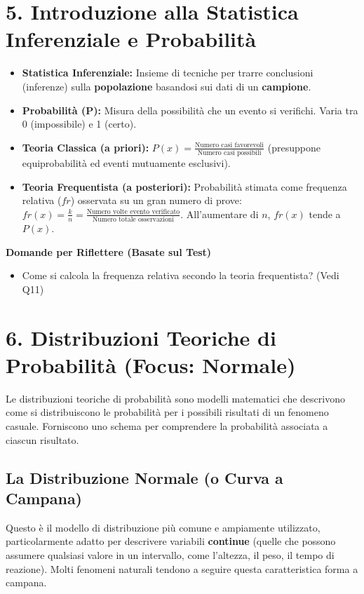 \documentclass[12pt, a4paper]{article}
\newenvironment{reflectionbox}{%
    \medskip %
    \begin{framed}\par\noindent
    \textbf{\color{boxtitlecolor}Domande per Riflettere (Basate sul Test)} \par
    \begin{itemize}[leftmargin=*, label=$\blacktriangleright$]
}{%
    \end{itemize}\par
    \end{framed}
    \medskip %
}
\begin{document}
\section*{5. Introduzione alla Statistica Inferenziale e Probabilità}
\begin{itemize}
    \item \textbf{Statistica Inferenziale:} Insieme di tecniche per trarre conclusioni (inferenze) sulla \textbf{popolazione} basandosi sui dati di un \textbf{campione}.
    \item \textbf{Probabilità (P):} Misura della possibilità che un evento si verifichi. Varia tra 0 (impossibile) e 1 (certo).
    \item \textbf{Teoria Classica (a priori):} $P(x) = \frac{\text{Numero casi favorevoli}}{\text{Numero casi possibili}}$ (presuppone equiprobabilità ed eventi mutuamente esclusivi).
    \item \textbf{Teoria Frequentista (a posteriori):} Probabilità stimata come frequenza relativa ($fr$) osservata su un gran numero di prove: $fr(x) = \frac{k}{n} = \frac{\text{Numero volte evento verificato}}{\text{Numero totale osservazioni}}$. All'aumentare di $n$, $fr(x)$ tende a $P(x)$.
\end{itemize}

\begin{reflectionbox}
    \item Come si calcola la frequenza relativa secondo la teoria frequentista? (Vedi Q11)
\end{reflectionbox}

\section*{6. Distribuzioni Teoriche di Probabilità (Focus: Normale)}
Le distribuzioni teoriche di probabilità sono modelli matematici che descrivono come si distribuiscono le probabilità per i possibili risultati di un fenomeno casuale. Forniscono uno schema per comprendere la probabilità associata a ciascun risultato.

\subsection*{La Distribuzione Normale (o Curva a Campana)}
Questo è il modello di distribuzione più comune e ampiamente utilizzato, particolarmente adatto per descrivere variabili \textbf{continue} (quelle che possono assumere qualsiasi valore in un intervallo, come l'altezza, il peso, il tempo di reazione). Molti fenomeni naturali tendono a seguire questa caratteristica forma a campana.
\end{document}
